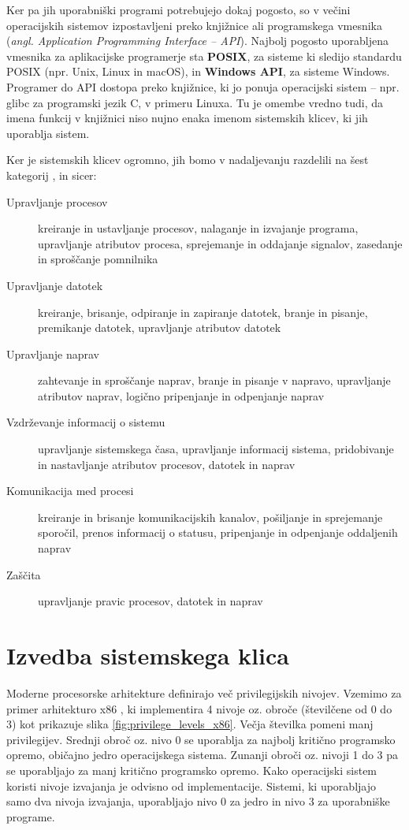 \documentclass[a4paper,12pt,openright]{book}
\begin{document}
Ker pa jih uporabniški programi potrebujejo dokaj pogosto, so v večini operacijskih sistemov izpostavljeni preko knjižnice ali programskega vmesnika (\textit{angl. Application Programming Interface -- API}).
Najbolj pogosto uporabljena vmesnika za aplikacijske programerje sta \textbf{POSIX}, za sisteme ki sledijo standardu POSIX (npr. Unix, Linux in macOS), in \textbf{Windows API}, za sisteme Windows.
Programer do API dostopa preko knjižnice, ki jo ponuja operacijski sistem -- npr. glibc za programski jezik C, v primeru Linuxa.
Tu je omembe vredno tudi, da imena funkcij v knjižnici niso nujno enaka imenom sistemskih klicev, ki jih uporablja sistem.

Ker je sistemskih klicev ogromno, jih bomo v nadaljevanju razdelili na šest kategorij \cite{Silberschatz_Galvin_Gagne_2018}, in sicer:
\begin{description}
	\item[Upravljanje procesov] kreiranje in ustavljanje procesov, nalaganje in izvajanje programa, upravljanje atributov procesa, sprejemanje in oddajanje signalov, zasedanje in sproščanje pomnilnika
	\item[Upravljanje datotek] kreiranje, brisanje, odpiranje in zapiranje datotek, branje in pisanje, premikanje datotek, upravljanje atributov datotek
	\item[Upravljanje naprav] zahtevanje in sproščanje naprav, branje in pisanje v napravo, upravljanje atributov naprav, logično pripenjanje in odpenjanje naprav
	\item[Vzdrževanje informacij o sistemu] upravljanje sistemskega časa, upravljanje informacij sistema, pridobivanje in nastavljanje atributov procesov, datotek in naprav
	\item[Komunikacija med procesi] kreiranje in brisanje komunikacijskih kanalov, pošiljanje in sprejemanje sporočil, prenos informacij o statusu, pripenjanje in odpenjanje oddaljenih naprav
	\item[Zaščita] upravljanje pravic procesov, datotek in naprav
\end{description}

\section{Izvedba sistemskega klica} \label{sec:syscall_execution}

Moderne procesorske arhitekture definirajo več privilegijskih nivojev.
Vzemimo za primer arhitekturo x86 \cite{Intel_2024}, ki implementira 4 nivoje oz. obroče (številčene od 0 do 3) kot prikazuje slika \ref{fig:privilege_levels_x86}.
Večja številka pomeni manj privilegijev.
Srednji obroč oz. nivo 0 se uporablja za najbolj kritično programsko opremo, običajno jedro operacijskega sistema.
Zunanji obroči oz. nivoji 1 do 3 pa se uporabljajo za manj kritično programsko opremo.
Kako operacijski sistem koristi nivoje izvajanja je odvisno od implementacije.
Sistemi, ki uporabljajo samo dva nivoja izvajanja, uporabljajo nivo 0 za jedro in nivo 3 za uporabniške programe.
\end{document}
